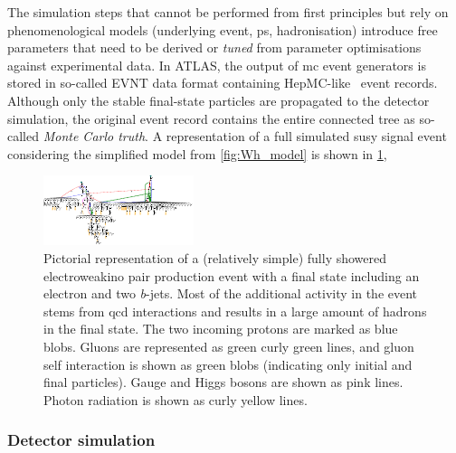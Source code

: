  The simulation steps that cannot be performed from first principles but rely on phenomenological models (underlying event, \gls{ps}, hadronisation) introduce free parameters that need to be derived or \textit{tuned} from parameter optimisations against experimental data. In ATLAS, the output of \gls{mc} event generators is stored in so-called EVNT data format containing HepMC-like~\cite{Dobbs:2001ck} event records. Although only the stable final-state particles are propagated to the detector simulation, the original event record contains the entire connected tree as so-called \textit{Monte Carlo truth}. A representation of a full simulated \gls{susy} signal event considering the simplified model from \cref{fig:Wh_model} is shown in \cref{fig:mcviz_signal},
		
\begin{figure}
	\centering    
	\includegraphics[width=\textwidth]{test26}
	\caption{Pictorial representation of a (relatively simple) fully showered electroweakino pair production event with a final state including an electron and two \textit{b}-jets. Most of the additional activity in the event stems from \gls{qcd} interactions and results in a large amount of hadrons in the final state. The two incoming protons are marked as blue blobs. Gluons are represented as green curly green lines, and gluon self interaction is shown as green blobs (indicating only initial and final particles). Gauge and Higgs bosons are shown as pink lines. Photon radiation is shown as curly yellow lines.}
	\label{fig:mcviz_signal}
\end{figure}		
		
\subsubsection{Detector simulation}\label{sec:detector_simulation}

